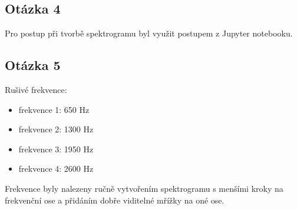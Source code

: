 \documentclass[a4paper,12pt]{article}
\begin{document}
\newpage
\subsection{Otázka 4}
\begin{figure}[h!]
\end{figure}
Pro postup při tvorbě spektrogramu byl využit postupem z Jupyter notebooku.

\newpage
\subsection{Otázka 5}
Rušivé frekvence:
\begin{itemize}
	\item frekvence 1: 650 Hz
	\item frekvence 2: 1300 Hz
	\item frekvence 3: 1950 Hz
	\item frekvence 4: 2600 Hz
\end{itemize}
Frekvence byly nalezeny ručně vytvořením spektrogramu s menšími kroky na frekvenční ose a přidáním dobře viditelné mřížky na oné ose. 
\end{document}
